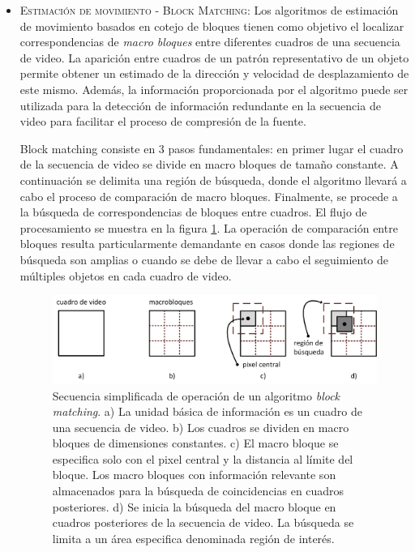 	\begin{itemize}

			\item 	\textsc{Estimación de movimiento - Block Matching}\cite{chapter0:6701287}: Los algoritmos de estimación de movimiento basados en cotejo de bloques tienen como objetivo el localizar correspondencias de \textit{macro bloques} entre diferentes cuadros de una secuencia de video. La aparición entre cuadros de un patrón representativo de un objeto permite obtener un estimado de la dirección y velocidad de desplazamiento de este mismo. Además, la información proporcionada por el algoritmo puede ser utilizada para la detección de información redundante en la secuencia de video para facilitar el proceso de compresión de la fuente.

			Block matching consiste en 3 pasos fundamentales: en primer lugar el cuadro de la secuencia de video se divide en macro bloques de tamaño constante. A continuación se delimita una región de búsqueda, donde el algoritmo llevará a cabo el proceso de comparación de macro bloques. Finalmente, se procede a la búsqueda de correspondencias de bloques entre cuadros. El flujo de procesamiento se muestra en la figura \ref{fig:ch0_block_matching}. La operación de comparación entre bloques resulta particularmente demandante en casos donde las regiones de búsqueda son amplias o cuando se debe de llevar a cabo el seguimiento de múltiples objetos en cada cuadro de video.

				\begin{figure}
					\begin{center}
						\includegraphics[scale = 0.8]{figures/ch0_block_matching.png}
					\end{center}
					\caption
						{	
							Secuencia simplificada de operación de un algoritmo \textit{block matching}. a) La unidad básica de información es un cuadro de una secuencia de video. b) Los cuadros se dividen en macro bloques de dimensiones constantes. c) El macro bloque se especifica solo con el pixel central y la distancia al límite del bloque. Los macro bloques con información relevante son almacenados para la búsqueda de coincidencias en cuadros posteriores. d) Se inicia la búsqueda del macro bloque en cuadros posteriores de la secuencia de video. La búsqueda se limita a un área especifica denominada región de interés.
						}
					\label{fig:ch0_block_matching}
				\end{figure}



\end{itemize}
